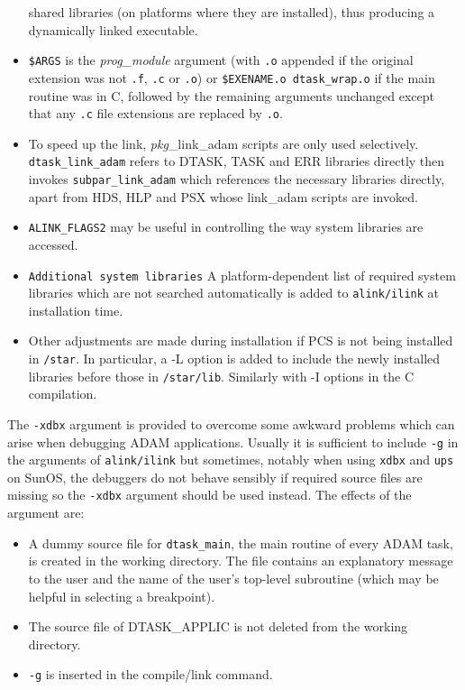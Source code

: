 \documentclass[twoside,11pt,nolof]{starlink}
\begin{document}
\begin{itemize}
shared libraries (on platforms where they are installed), thus producing a
dynamically linked executable.
\item \texttt{\$ARGS} is the \textit{prog\_module} argument (with \texttt{.o}
appended if the original extension was not \texttt{.f}, \texttt{.c} or
\texttt{.o})
or \texttt{\$EXENAME.o dtask\_wrap.o} if the main routine was in C, followed
by the remaining arguments unchanged except that any \texttt{.c} file
extensions are replaced by \texttt{.o}.
\item To speed up the link, \textit{pkg}\_link\_adam scripts are only used
selectively.
\texttt{dtask\_link\_adam} refers to DTASK, TASK and ERR libraries directly then
invokes \texttt{subpar\_link\_adam} which references the necessary
libraries directly, apart from HDS, HLP and PSX whose link\_adam scripts are
invoked.
\item \texttt{ALINK\_FLAGS2} may be useful in controlling the way system
libraries are accessed.
\item \texttt{Additional system libraries} A platform-dependent list of
required system libraries which are not searched automatically is added to
\texttt{alink/ilink} at installation time.
\item Other adjustments are made during installation if PCS is not being
installed in \texttt{/star}.
In particular, a -L option is added to include the newly installed libraries
before those in \texttt{/star/lib}.
Similarly with -I options in the C compilation.
\end{itemize}
The \texttt{-xdbx} argument is provided to overcome some awkward problems which
can arise when debugging ADAM applications. Usually it is sufficient to
include \texttt{-g} in the arguments of \texttt{alink/ilink} but sometimes,
notably when using \texttt{xdbx} and \texttt{ups} on SunOS, the debuggers do
not behave sensibly if required source files are missing so the \texttt{-xdbx}
argument should be used instead.
The effects of the argument are:
\begin{itemize}
\item A dummy source file for \texttt{dtask\_main}, the main routine of every
ADAM task, is created in the working directory.
The file contains an explanatory message to the user and the name of the
user's top-level subroutine (which may be helpful in selecting a breakpoint).
\item The source file of DTASK\_APPLIC is not deleted from the working
directory.
\item \texttt{-g} is inserted in the compile/link command.
\end{itemize}
\newpage
\end{document}
